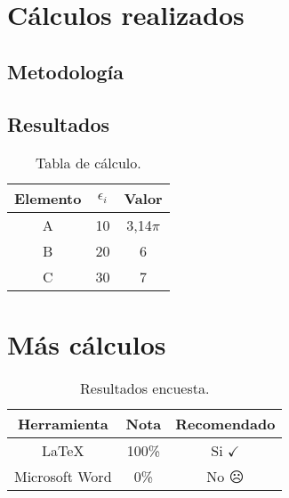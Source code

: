 \newpage
\begin{anexo}
	\section{Cálculos realizados}

		\subsection{Metodología}
			\lipsum[1]


		\subsection{Resultados}
			\lipsum[10]

			\begin{table}[htbp]
				\centering
				\caption{Tabla de cálculo.}
				\begin{tabular}{ccc}
					\hline
					\textbf{Elemento} & $\epsilon_i$ & \boldmath{}\textbf{Valor}\unboldmath{} \bigstrut\\
					\hline
					A     & 10    & 3,14$\pi$ \bigstrut[t]\\
					B     & 20    & 6 \\
					C     & 30    & 7 \\
					\end{tabular}
				\label{tab:anexo-1}
			\end{table}

	\newpage
	\section{Más cálculos}

		\lipsum[1]

		\newp \lipsum[4]

		\begin{table}[htbp]
			\centering
			\caption{Resultados encuesta.}
			\begin{tabular}{ccc}
				\hline
				\textbf{Herramienta} & \textbf{Nota} & \textbf{Recomendado} \bigstrut\\
				\hline
				\LaTeX & 100\% & Si $\checkmark$ \\
				Microsoft Word \textsuperscript{\textregistered} & 0\% & No $\frownie$\\
			\end{tabular}
			\label{tab:anexo-2}
		\end{table}

\end{anexo}
